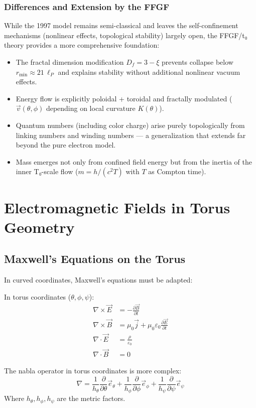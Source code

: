 \documentclass[12pt,a4paper]{article}
\begin{document}
\subsubsection{Differences and Extension by the FFGF}

While the 1997 model remains semi-classical and leaves the self-confinement mechanisms (nonlinear effects, topological stability) largely open, the FFGF/t₀ theory provides a more comprehensive foundation:

\begin{itemize}
	\item The fractal dimension modification $D_f = 3 - \xi$ prevents collapse below $r_{\min} \approx 21\,\ell_P$ and explains stability without additional nonlinear vacuum effects.
	\item Energy flow is explicitly poloidal + toroidal and fractally modulated ($\vec{v}(\theta,\phi)$ depending on local curvature $K(\theta)$).
	\item Quantum numbers (including color charge) arise purely topologically from linking numbers and winding numbers — a generalization that extends far beyond the pure electron model.
	\item Mass emerges not only from confined field energy but from the inertia of the inner T₀-scale flow ($m = h/(c^2 T)$ with $T$ as Compton time).
\end{itemize}

\section{Electromagnetic Fields in Torus Geometry}
\subsection{Maxwell's Equations on the Torus}
In curved coordinates, Maxwell's equations must be adapted:

In torus coordinates (\( \theta, \phi, \psi \)):
\begin{align}
	\nabla \times \vec{E} &= -\frac{\partial \vec{B}}{\partial t} \\
	\nabla \times \vec{B} &= \mu_0 \vec{j} + \mu_0 \varepsilon_0 \frac{\partial \vec{E}}{\partial t} \\
	\nabla \cdot \vec{E} &= \frac{\rho}{\varepsilon_0} \\
	\nabla \cdot \vec{B} &= 0
\end{align}

The nabla operator in torus coordinates is more complex:
\[
\nabla = \frac{1}{h_\theta} \frac{\partial}{\partial \theta} \vec{e}_\theta + \frac{1}{h_\phi} \frac{\partial}{\partial \phi} \vec{e}_\phi + \frac{1}{h_\psi} \frac{\partial}{\partial \psi} \vec{e}_\psi
\]
Where \( h_\theta, h_\phi, h_\psi \) are the metric factors.
\end{document}
